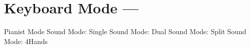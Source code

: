 \section{Keyboard Mode --- \UiKey{\SND}}
Pianist Mode
Sound Mode: Single
Sound Mode: Dual
Sound Mode: Split
Sound Mode: 4Hands
